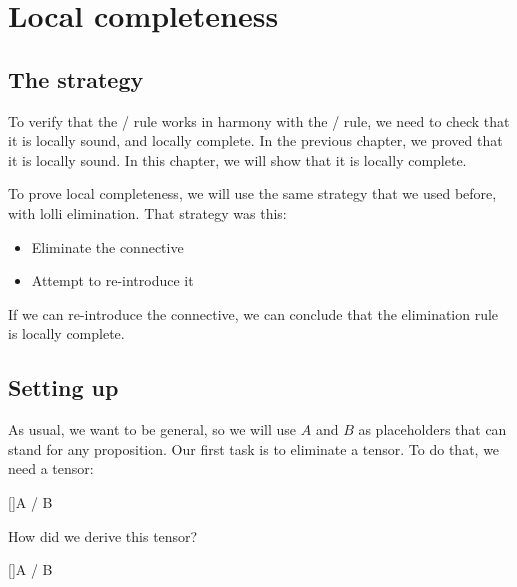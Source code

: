 \documentclass[../../../main.tex]{subfiles}
\begin{document}
\chapter{Local completeness}


\section{The strategy}

To verify that the \tensorElim/ rule works in harmony with the \tensorIntro/ rule, we need to check that it is locally sound, and locally complete. In the previous chapter, we proved that it is locally sound. In this chapter, we will show that it is locally complete. 

To prove local completeness, we will use the same strategy that we used before, with lolli elimination. That strategy was this: 

\begin{itemize}
  \item{Eliminate the connective}
  \item{Attempt to re-introduce it} 
\end{itemize}

\noindent
If we can re-introduce the connective, we can conclude that the elimination rule is locally complete.


\section{Setting up}

As usual, we want to be general, so we will use $A$ and $B$ as placeholders that can stand for any proposition. Our first task is to eliminate a tensor. To do that, we need a tensor:

\begin{prooftree*}
  \hypo{}
  \ellipsis{}{}
  []{A \tensor/ B}
\end{prooftree*}

\noindent
How did we derive this tensor? 

\begin{prooftree*}
  \ellipsis{}{}
  []{A \tensor/ B}
\end{prooftree*}
\end{document}
